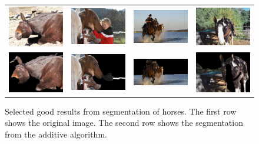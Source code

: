 \documentclass[10pt,twocolumn,letterpaper]{article}
\begin{document}
\begin{figure}[p]
\centering
\begin{tabular}{ p{3cm} p{3cm} p{3cm} p{3cm} }
\includegraphics[width=2.95cm]{figures/add_res/horse/2008_001542.jpg.eps} &
\includegraphics[width=2.95cm]{figures/add_res/horse/2008_001992.jpg.eps} &
\includegraphics[width=2.95cm]{figures/add_res/horse/2008_002172.jpg.eps} &
\includegraphics[width=2.95cm]{figures/add_res/horse/2008_002509.jpg.eps} \\
\includegraphics[width=2.95cm]{figures/add_res/horse/2008_001542.jpg_3_good.jpg.eps} &
\includegraphics[width=2.95cm]{figures/add_res/horse/2008_001992.jpg_3_good.jpg.eps} &
\includegraphics[width=2.95cm]{figures/add_res/horse/2008_002172.jpg_3_good.jpg.eps} &
\includegraphics[width=2.95cm]{figures/add_res/horse/2008_002509.jpg_3_good.jpg.eps} \\
\end{tabular}
\caption{Selected good results from segmentation of horses.  
The first row shows the original image.  The second row shows
the segmentation from the additive algorithm.}
\label{fig:horse_good_results}
\end{figure}
\end{document}

